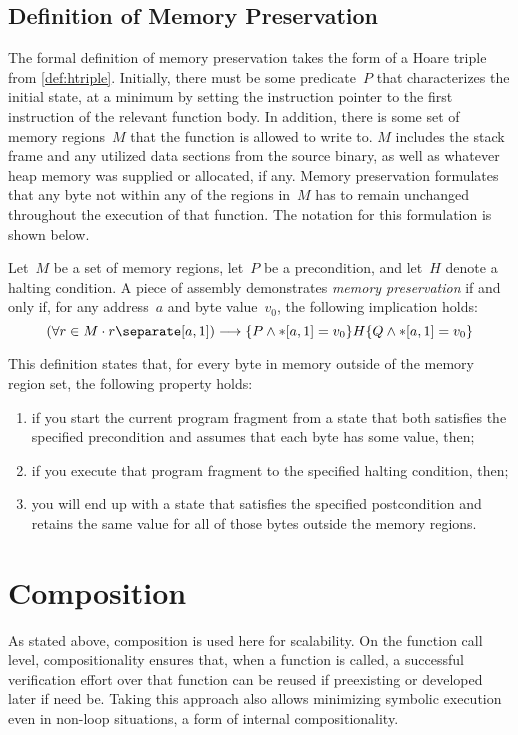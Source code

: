 \subsection{Definition of Memory Preservation}\label{sse:mem_pres}
The formal definition of memory preservation%
takes the form of a Hoare triple from \cref{def:htriple}.
Initially, there must be some predicate~$P$ that characterizes the initial state,
at a minimum by setting the instruction pointer
to the first instruction of the relevant function body.
In addition, there is some set of memory regions~$M$
that the function is allowed to write to.
$M$ includes the stack frame and any utilized data sections from the source binary,
as well as whatever heap memory was supplied or allocated, if any.
Memory preservation formulates that any byte not within any of the regions in~$M$
has to remain unchanged throughout the execution of that function.
The notation for this formulation is shown below.
\begin{definition}\label{mem_pres_hoare}
  Let~$M$ be a set of memory regions, let~$P$ be a precondition,
  and let~$H$ denote a halting condition.
  A piece of assembly demonstrates \emph{memory preservation} if and only if,
  for any address~$a$ and byte value~$v_0$, the following implication holds:
  \begin{equation}
  (\forall r\in M\cdot r\separate\region{a}1)\longrightarrow\htriple{P\wedge \readmem{a}1=v_0}H{Q\wedge\readmem{a}1=v_0}
  \end{equation}
\end{definition}
This definition states that, for every byte in memory outside of the memory region set,
the following property holds:
\begin{enumerate}
  \item if you start the current program fragment from a state that both satisfies
  the specified precondition and assumes that each byte has some value, then;
  \item if you execute that program fragment to the specified halting condition, then;
  \item you will end up with a state that satisfies the specified postcondition
  and retains the same value for all of those bytes outside the memory regions.
\end{enumerate}

\section{Composition}\label{se:cfg_composition}
As stated above, composition is used here for scalability.%
On the function call level, compositionality ensures that,
when a function is called,
a successful verification effort over that function can be reused
if preexisting or developed later if need be.
Taking this approach also allows minimizing symbolic execution
even in non-loop situations, a form of internal compositionality.

